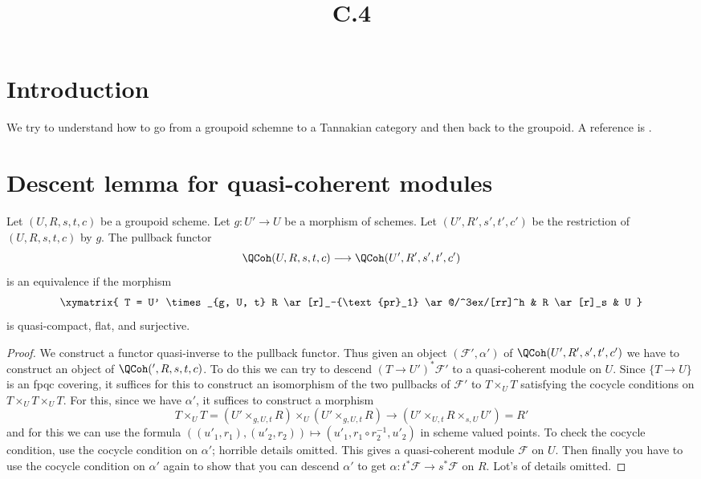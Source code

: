 

%


\title{C.4}


\maketitle

\label{section-phantom}


\tableofcontents


\section{Introduction}
\label{section-introduction}

\noindent
We try to understand how to go from a groupoid schemne to a
Tannakian category and then back to the groupoid.
A reference is \cite{Deligne-tannakian}.



\section{Descent lemma for quasi-coherent modules}
\label{section-descent}

\begin{lemma}
\label{lemma-descent}
Let $(U, R, s, t, c)$ be a groupoid scheme. Let $g : U' \to U$ be a morphism
of schemes. Let $(U', R', s', t', c')$ be the restriction of $(U, R, s, t, c)$
by $g$. The pullback functor
$$
\QCoh(U, R, s, t, c)
\longrightarrow
\QCoh(U', R', s', t', c')
$$
is an equivalence if the morphism
$$
\xymatrix{
T = U' \times_{g, U, t} R \ar[r]_-{\text{pr}_1} \ar@/^3ex/[rr]^h
& R \ar[r]_s & U
}
$$
is quasi-compact, flat, and surjective.
\end{lemma}

\begin{proof}
We construct a functor quasi-inverse to the pullback functor.
Thus given an object $(\mathcal{F}', \alpha')$ of
$\QCoh(U', R', s', t', c')$ we have to construct an object
of $\QCoh(', R, s, t, c)$. To do this we can try to descend
$(T \to U')^*\mathcal{F}'$ to a quasi-coherent module on $U$.
Since $\{T \to U\}$ is an fpqc covering, it suffices for this
to construct an isomorphism of the two pullbacks of $\mathcal{F}'$
to $T \times_U T$ satisfying the cocycle conditions on
$T \times_U T \times_U T$. For this, since we have $\alpha'$, it suffices
to construct a morphism
$$
T \times_U T =
(U' \times_{g, U, t} R)
\times_U
(U' \times_{g, U, t} R)
\longrightarrow
(U' \times_{U, t} R \times_{s, U} U') = R'
$$
and for this we can use the formula
$((u'_1, r_1), (u'_2, r_2)) \mapsto (u'_1, r_1 \circ r_2^{-1}, u'_2)$
in scheme valued points. To check the cocycle condition, use the
cocycle condition on $\alpha'$; horrible details omitted.
This gives a quasi-coherent module $\mathcal{F}$ on $U$.
Then finally you have to use the cocycle condition on $\alpha'$
again to show that you can descend $\alpha'$ to get
$\alpha : t^*\mathcal{F} \to s^*\mathcal{F}$ on $R$. Lot's of
details omitted.
\end{proof}



